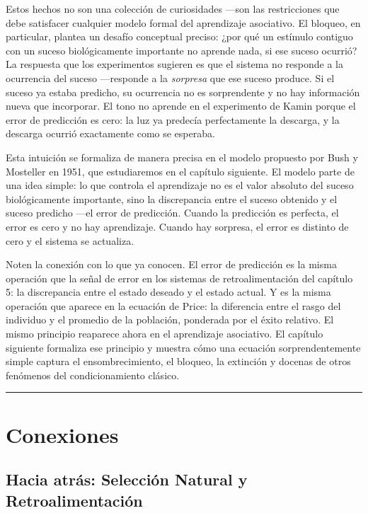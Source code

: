 \documentclass[
  letterpaper,
  DIV=11,
  numbers=noendperiod]{scrreprt}
\begin{document}
\begin{tcolorbox}[enhanced jigsaw, toprule=.15mm, arc=.35mm, colback=white, opacityback=0, colframe=quarto-callout-note-color-frame, breakable, rightrule=.15mm, left=2mm, leftrule=.75mm, bottomrule=.15mm]
Estos hechos no son una colección de curiosidades ---son las
restricciones que debe satisfacer cualquier modelo formal del
aprendizaje asociativo. El bloqueo, en particular, plantea un desafío
conceptual preciso: ¿por qué un estímulo contiguo con un suceso
biológicamente importante no aprende nada, si ese suceso ocurrió? La
respuesta que los experimentos sugieren es que el sistema no responde a
la ocurrencia del suceso ---responde a la \emph{sorpresa} que ese suceso
produce. Si el suceso ya estaba predicho, su ocurrencia no es
sorprendente y no hay información nueva que incorporar. El tono no
aprende en el experimento de Kamin porque el error de predicción es
cero: la luz ya predecía perfectamente la descarga, y la descarga
ocurrió exactamente como se esperaba.

Esta intuición se formaliza de manera precisa en el modelo propuesto por
Bush y Mosteller en 1951, que estudiaremos en el capítulo siguiente. El
modelo parte de una idea simple: lo que controla el aprendizaje no es el
valor absoluto del suceso biológicamente importante, sino la
discrepancia entre el suceso obtenido y el suceso predicho ---el error
de predicción. Cuando la predicción es perfecta, el error es cero y no
hay aprendizaje. Cuando hay sorpresa, el error es distinto de cero y el
sistema se actualiza.

Noten la conexión con lo que ya conocen. El error de predicción es la
misma operación que la señal de error en los sistemas de
retroalimentación del capítulo 5: la discrepancia entre el estado
deseado y el estado actual. Y es la misma operación que aparece en la
ecuación de Price: la diferencia entre el rasgo del individuo y el
promedio de la población, ponderada por el éxito relativo. El mismo
principio reaparece ahora en el aprendizaje asociativo. El capítulo
siguiente formaliza ese principio y muestra cómo una ecuación
sorprendentemente simple captura el ensombrecimiento, el bloqueo, la
extinción y docenas de otros fenómenos del condicionamiento clásico.

\begin{center}\rule{0.5\linewidth}{0.5pt}\end{center}

\section{Conexiones}\label{conexiones-1}

\subsection{Hacia atrás: Selección Natural y
Retroalimentación}\label{hacia-atruxe1s-selecciuxf3n-natural-y-retroalimentaciuxf3n}


\end{tcolorbox}
\end{document}
